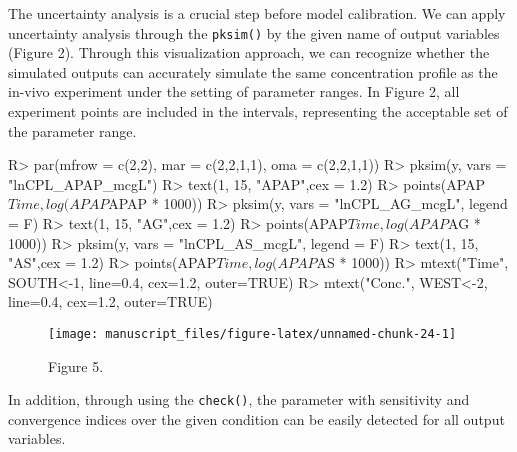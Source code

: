 \documentclass[article]{jss}
\begin{document}
The uncertainty analysis is a crucial step before model calibration. We
can apply uncertainty analysis through the \texttt{pksim()} by the given
name of output variables (Figure 2). Through this visualization
approach, we can recognize whether the simulated outputs can accurately
simulate the same concentration profile as the in-vivo experiment under
the setting of parameter ranges. In Figure 2, all experiment points are
included in the intervals, representing the acceptable set of the
parameter range.

\begin{CodeChunk}

\begin{CodeInput}
R> par(mfrow = c(2,2), mar = c(2,2,1,1), oma = c(2,2,1,1))
R> pksim(y, vars = "lnCPL_APAP_mcgL")
R> text(1, 15, "APAP",cex = 1.2)
R> points(APAP$Time, log(APAP$APAP * 1000))
R> pksim(y, vars = "lnCPL_AG_mcgL", legend = F)
R> text(1, 15, "AG",cex = 1.2)
R> points(APAP$Time, log(APAP$AG * 1000))
R> pksim(y, vars = "lnCPL_AS_mcgL", legend = F)
R> text(1, 15, "AS",cex = 1.2)
R> points(APAP$Time, log(APAP$AS * 1000))
R> mtext("Time", SOUTH<-1, line=0.4, cex=1.2, outer=TRUE)
R> mtext("Conc.", WEST<-2, line=0.4, cex=1.2, outer=TRUE)
\end{CodeInput}
\begin{figure}

{\centering \texttt{[image: manuscript\_files/figure-latex/unnamed-chunk-24-1]} 

}

\caption[Figure 5]{Figure 5. }\label{fig:unnamed-chunk-24}
\end{figure}
\end{CodeChunk}

In addition, through using the \texttt{check()}, the parameter with
sensitivity and convergence indices over the given condition can be
easily detected for all output variables.
\end{document}
